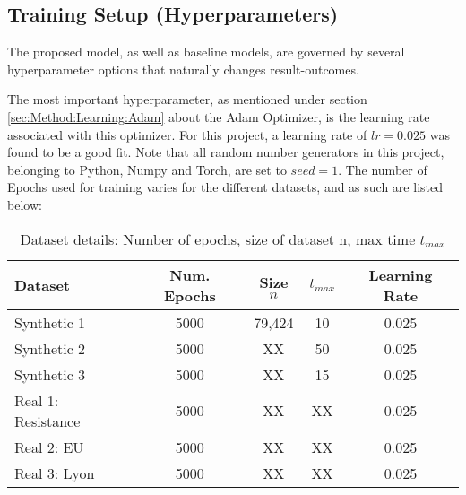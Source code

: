 \subsection{Training Setup (Hyperparameters)}
\label{sec:Method:Reproducibility:TrainingSetup}
The proposed model, as well as baseline models, are governed by several hyperparameter options that naturally changes result-outcomes. 

The most important hyperparameter, as mentioned under section \ref{sec:Method:Learning:Adam} about the Adam Optimizer, is the learning rate associated with this optimizer. 
For this project, a learning rate of $lr = 0.025$ was found to be a good fit.
Note that all random number generators in this project, belonging to Python, Numpy and Torch, are set to $seed = 1$.
The number of Epochs used for training varies for the different datasets, and as such are listed below:

\begin{table}[H]
\centering
\begin{tabular}{|l|cccc|}
\hline
Dataset             & Num. Epochs & Size $n$ & $t_{max}$ & Learning Rate \\ \hline
Synthetic 1         & 5000          & 79,424   & 10        & 0.025       \\
Synthetic 2         & 5000          & XX       & 50        & 0.025         \\
Synthetic 3         & 5000          & XX       & 15        & 0.025         \\
Real 1: Resistance  & 5000          & XX       & XX        & 0.025         \\
Real 2: EU          & 5000          & XX       & XX        & 0.025         \\
Real 3: Lyon        & 5000          & XX       & XX        & 0.025         \\ \hline
\end{tabular}
\caption{Dataset details: Number of epochs, size of dataset n, max time $t_{max}$}
\label{tab:DatasetDetails}
\end{table}